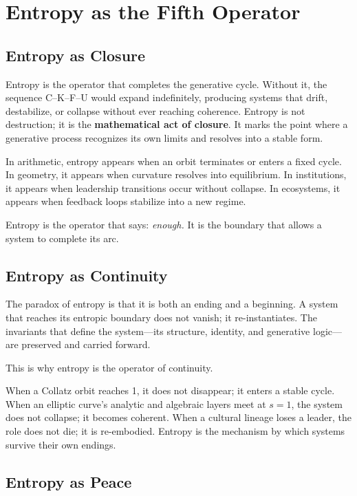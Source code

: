 \documentclass[14pt, twoside, openright]{book}
\theoremstyle{definition}
\theoremstyle{remark}
\begin{document}
\chapter{Entropy as the Fifth Operator}

\section{Entropy as Closure}

Entropy is the operator that completes the generative cycle. Without it, the
sequence C--K--F--U would expand indefinitely, producing systems that drift,
destabilize, or collapse without ever reaching coherence. Entropy is not
destruction; it is the \textbf{mathematical act of closure}. It marks the point
where a generative process recognizes its own limits and resolves into a stable
form.

In arithmetic, entropy appears when an orbit terminates or enters a fixed cycle.
In geometry, it appears when curvature resolves into equilibrium. In institutions,
it appears when leadership transitions occur without collapse. In ecosystems, it
appears when feedback loops stabilize into a new regime.

Entropy is the operator that says: \textit{enough.} It is the boundary that
allows a system to complete its arc.

\section{Entropy as Continuity}

The paradox of entropy is that it is both an ending and a beginning. A system
that reaches its entropic boundary does not vanish; it re-instantiates. The
invariants that define the system---its structure, identity, and generative
logic---are preserved and carried forward.

This is why entropy is the operator of continuity.

When a Collatz orbit reaches 1, it does not disappear; it enters a stable cycle.
When an elliptic curve's analytic and algebraic layers meet at $s = 1$, the
system does not collapse; it becomes coherent. When a cultural lineage loses a
leader, the role does not die; it is re-embodied. Entropy is the mechanism by
which systems survive their own endings.

\section{Entropy as Peace}
\end{document}
